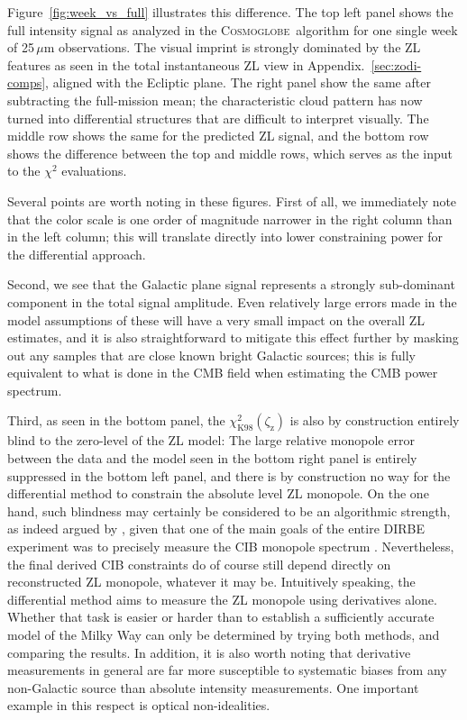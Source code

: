 \documentclass[twocolumn]{aa}
\newcommand{\cosmoglobe}{\textsc{Cosmoglobe}}
\begin{document}
Figure~\ref{fig:week_vs_full} illustrates this difference. The top
left panel shows the full intensity signal as analyzed in the
\cosmoglobe\ algorithm for one single week of 25\,$\mu$m
observations. The visual imprint is strongly dominated by the ZL
features as seen in the total instantaneous ZL view in Appendix.~\ref{sec:zodi-comps}, aligned with the Ecliptic
plane. The right panel show the same after subtracting the
full-mission mean; the characteristic cloud pattern has now turned
into differential structures that are difficult to interpret
visually. The middle row shows the same for the predicted ZL signal,
and the bottom row shows the difference between the top and middle
rows, which serves as the input to the $\chi^2$ evaluations.

Several points are worth noting in these figures. First of all, we
immediately note that the color scale is one order of magnitude narrower
in the right column than in the left column; this will translate
directly into lower constraining power for the differential
approach.

Second, we see that the Galactic plane signal represents a strongly
sub-dominant component in the total signal amplitude. Even relatively
large errors made in the model assumptions of these will have a very
small impact on the overall ZL estimates, and it is also
straightforward to mitigate this effect further by masking out any
samples that are close known bright Galactic sources; this is fully
equivalent to what is done in the CMB field when estimating the CMB
power spectrum.

Third, as seen in the bottom panel, the $\chi^2_{\mathrm{K98}}
(\zeta_{\mathrm{z}})$ is also by construction entirely blind to the
zero-level of the ZL model: The large relative monopole error between
the data and the model seen in the bottom right panel is entirely
suppressed in the bottom left panel, and there is by construction no
way for the differential method to constrain the absolute level ZL
monopole. On the one hand, such blindness may certainly be considered
to be an algorithmic strength, as indeed argued by
\citet{Kelsall1998}, given that one of the main goals of the entire
DIRBE experiment was to precisely measure the CIB monopole spectrum
\citep{hauser1998}. Nevertheless, the final derived CIB constraints do
of course still depend directly on reconstructed ZL monopole, whatever
it may be. Intuitively speaking, the differential method aims to
measure the ZL monopole using derivatives alone. Whether that task is
easier or harder than to establish a sufficiently accurate model of
the Milky Way can only be determined by trying both methods, and
comparing the results. In addition, it is also worth noting that
derivative measurements in general are far more susceptible to
systematic biases from any non-Galactic source than absolute intensity
measurements. One important example in this respect is optical
non-idealities.
\end{document}
